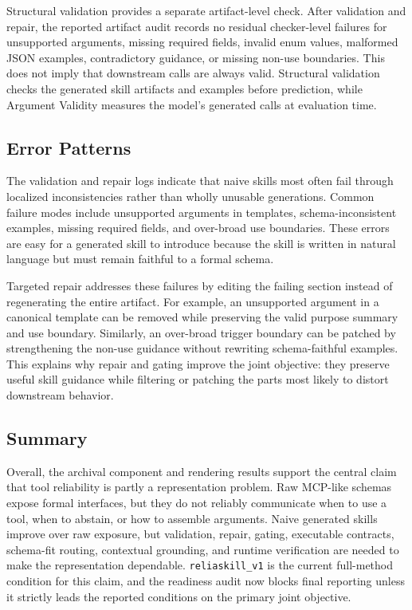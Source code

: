 \documentclass[11pt]{article}
\begin{document}
Structural validation provides a separate artifact-level check. After validation and repair, the reported artifact audit records no residual checker-level failures for unsupported arguments, missing required fields, invalid enum values, malformed JSON examples, contradictory guidance, or missing non-use boundaries. This does not imply that downstream calls are always valid. Structural validation checks the generated skill artifacts and examples before prediction, while Argument Validity measures the model's generated calls at evaluation time.

\subsection{Error Patterns}
\label{subsec:error_patterns}

The validation and repair logs indicate that naive skills most often fail through localized inconsistencies rather than wholly unusable generations. Common failure modes include unsupported arguments in templates, schema-inconsistent examples, missing required fields, and over-broad use boundaries. These errors are easy for a generated skill to introduce because the skill is written in natural language but must remain faithful to a formal schema.

Targeted repair addresses these failures by editing the failing section instead of regenerating the entire artifact. For example, an unsupported argument in a canonical template can be removed while preserving the valid purpose summary and use boundary. Similarly, an over-broad trigger boundary can be patched by strengthening the non-use guidance without rewriting schema-faithful examples. This explains why repair and gating improve the joint objective: they preserve useful skill guidance while filtering or patching the parts most likely to distort downstream behavior.

\subsection{Summary}
\label{subsec:results_summary}

Overall, the archival component and rendering results support the central claim that tool reliability is partly a representation problem. Raw MCP-like schemas expose formal interfaces, but they do not reliably communicate when to use a tool, when to abstain, or how to assemble arguments. Naive generated skills improve over raw exposure, but validation, repair, gating, executable contracts, schema-fit routing, contextual grounding, and runtime verification are needed to make the representation dependable. \texttt{reliaskill\_v1} is the current full-method condition for this claim, and the readiness audit now blocks final reporting unless it strictly leads the reported conditions on the primary joint objective.
\end{document}
